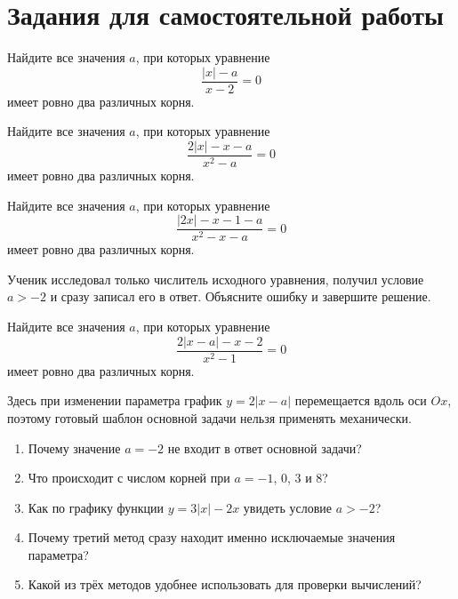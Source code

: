 \section{Задания для самостоятельной работы}

\begin{practicebox}
  Найдите все значения \(a\), при которых уравнение
  \[
    \frac{|x|-a}{x-2}=0
  \]
  имеет ровно два различных корня.
\end{practicebox}

\begin{practicebox}
  Найдите все значения \(a\), при которых уравнение
  \[
    \frac{2|x|-x-a}{x^2-a}=0
  \]
  имеет ровно два различных корня.
\end{practicebox}

\begin{practicebox}
  Найдите все значения \(a\), при которых уравнение
  \[
    \frac{|2x|-x-1-a}{x^2-x-a}=0
  \]
  имеет ровно два различных корня.
\end{practicebox}

\begin{practicebox}
  Ученик исследовал только числитель исходного уравнения, получил условие
  \(a>-2\) и сразу записал его в ответ. Объясните ошибку и завершите решение.
\end{practicebox}


\begin{practicebox}
  Найдите все значения \(a\), при которых уравнение
  \[
    \frac{2|x-a|-x-2}{x^2-1}=0
  \]
  имеет ровно два различных корня.

  Здесь при изменении параметра график \(y=2|x-a|\) перемещается вдоль оси
  \(Ox\), поэтому готовый шаблон основной задачи нельзя применять
  механически.
\end{practicebox}

\begin{questionsbox}
  \begin{enumerate}
    \item Почему значение \(a=-2\) не входит в ответ основной задачи?
    \item Что происходит с числом корней при \(a=-1\), \(0\), \(3\) и \(8\)?
    \item Как по графику функции \(y=3|x|-2x\) увидеть условие \(a>-2\)?
    \item Почему третий метод сразу находит именно исключаемые значения параметра?
    \item Какой из трёх методов удобнее использовать для проверки вычислений?
  \end{enumerate}
\end{questionsbox}

